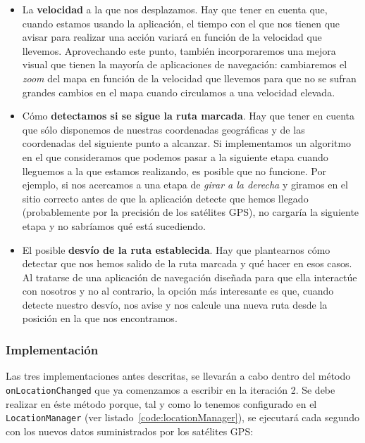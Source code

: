 \begin{itemize}
  \item La \textbf{velocidad} a la que nos desplazamos. Hay que tener en cuenta que, cuando estamos
    usando la aplicación, el tiempo con el que nos tienen que avisar para realizar una acción
    variará en función de la velocidad que llevemos. Aprovechando este punto, también incorporaremos
    una mejora visual que tienen la mayoría de aplicaciones de navegación: cambiaremos el
    \emph{zoom} del mapa en función de la velocidad que llevemos para que no se sufran grandes
    cambios en el mapa cuando circulamos a una velocidad elevada.

  \item Cómo \textbf{detectamos si se sigue la ruta marcada}. Hay que tener en cuenta que sólo
    disponemos de nuestras coordenadas geográficas y de las coordenadas del siguiente punto a
    alcanzar. Si implementamos un algoritmo en el que consideramos que podemos pasar a la siguiente
    etapa cuando lleguemos a la que estamos realizando, es posible que no funcione. Por ejemplo, si
    nos acercamos a una etapa de \emph{girar a la derecha} y giramos en el sitio correcto antes de
    que la aplicación detecte que hemos llegado (probablemente por la precisión de los satélites
    \acs{GPS}), no cargaría la siguiente etapa y no sabríamos qué está sucediendo.

  \item El posible \textbf{desvío de la ruta establecida}. Hay que plantearnos cómo detectar que nos
    hemos salido de la ruta marcada y qué hacer en esos casos. Al tratarse de una aplicación de
    navegación diseñada para que ella interactúe con nosotros y no al contrario, la opción más
    interesante es que, cuando detecte nuestro desvío, nos avise y nos calcule una nueva ruta desde
    la posición en la que nos encontramos.

\end{itemize}

\subsubsection{Implementación}

Las tres implementaciones antes descritas, se llevarán a cabo dentro del método
\texttt{onLocationChanged} que ya comenzamos a escribir en la iteración 2. Se debe realizar en éste
método porque, tal y como lo tenemos configurado en el \texttt{LocationManager} (ver
listado~\ref{code:locationManager}), se ejecutará cada segundo con los nuevos datos suministrados
por los satélites \acs{GPS}:

